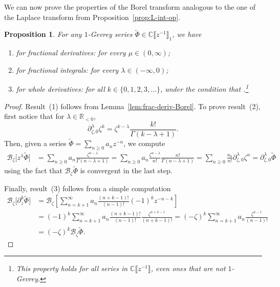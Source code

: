 \documentclass[pdftex]{sigma}
\newcommand{\R}{\mathbb{R}}
\newcommand{\C}{\mathbb{C}}
\newcommand{\series}[1]{\tilde{#1}}
\newcommand{\fracderiv}[3]{\partial^{#1}_{#2, #3}}
\newcommand{\borel}{\mathcal{B}}
\numberwithin{equation}{section}
\newtheorem{Proposition}[Theorem]{Proposition}
 { \theoremstyle{definition}
\newtheorem{Definition}[Theorem]{Definition}
\newtheorem{Remark}[Theorem]{Remark}
\newtheorem*{notation*}{Notation}
}
\begin{document}
We can now prove the properties of the Borel transform analogous to the one of the Laplace transform from Proposition~\ref{prop:L-int-op}.
\begin{Proposition}\label{prop:frac-der-int-borel}
For any $1$-Gevrey series $\series{\Phi}\in\C\big\llbracket z^{-1}\big\rrbracket_1$, we have
\begin{enumerate}[label=(\roman*)]\itemsep=0pt
\item[$(1)$] %
for fractional derivatives:
\smash{$\borel_\zeta\bigl[ z^\mu \series{\Phi}\bigr]=\fracderiv{\mu}{\zeta}{0} \borel_\zeta\series{\Phi}$} for every $\mu\in(0, \infty)$;
\item[$(2)$] %
for fractional integrals:
\smash{$\borel_\zeta\bigl[z^\lambda \series{\Phi}\bigr]=\fracderiv{\lambda}{\zeta}{0} \borel_\zeta\series{\Phi}$} for every $\lambda\in(-\infty, 0)$;
\item[$(3)$] %
for whole derivatives:
\smash{$\borel_\zeta\bigl[\partial_z^{k} \series{\Phi}\bigr]=(-\zeta)^k\borel_\zeta\series{\Phi}$} for all $k\in\{0, 1, 2, 3, \dots\}$, under the condition that \smash{$\series{\Phi}\in z^{-k-1}\big\llbracket z^{-1}\big\rrbracket_1$}.\footnote{This property holds for all series in $\C\big\llbracket z^{-1}\big\rrbracket$, even ones that are not $1$-Gevrey.}
\end{enumerate}
\end{Proposition}
\begin{proof}
Result~(1) follows from Lemma~\ref{lem:frac-deriv-Borel}.
To prove result~(2), first notice that for $\lambda \in \R_{< 0}$,
\[\fracderiv{\lambda}{\zeta}{0}\zeta^{k}=\zeta^{k-\lambda}\frac{k!}{\Gamma(k-\lambda+1)}.\]
Then, given a series $\series{\Phi} = \sum_{n\geq 0} a_n z^{-n}$, we compute
\begin{align*}
\borel_\zeta \bigl[z^\lambda \series{\Phi}\bigr] & = \sum_{n\geq 0}a_n\frac{\zeta^{n-\lambda}}{\Gamma(n-\lambda+1)} = \sum_{n\geq 0}a_n\frac{\zeta^{n-\lambda}}{n!}\frac{n!}{\Gamma(n-\lambda+1)} = \sum_{n\geq 0} \frac{a_n}{n!} \fracderiv{\lambda}{\zeta}{0}\zeta^n = \fracderiv{\lambda}{\zeta}{0}\series{\Phi}
\end{align*}
using the fact that $\borel_\zeta\series{\Phi}$ is convergent in the last step.

Finally, result~(3) follows from a simple computation
\begin{align*}
\borel_\zeta\bigl[\partial_z^k\series{\Phi}\bigr]&=\borel_\zeta\left[\sum_{n=k+1}^\infty a_n \frac{(n+k-1)!}{(n-1)!} (-1)^{k} z^{-n-k}\right]\\
&=(-1)^k \sum_{n=k+1}^\infty a_n \frac{(n+k-1)!}{(n-1)!}\frac{\zeta^{n+k-1}}{(n+k-1)!}=(-\zeta)^k\sum_{n=k+1}^\infty a_n \frac{\zeta^{n-1}}{(n-1)!}\\
&=(-\zeta)^k\borel_\zeta \series{\Phi}.\tag*{\qed}
\end{align*} \renewcommand{\qed}{}
\end{proof}
\end{document}
